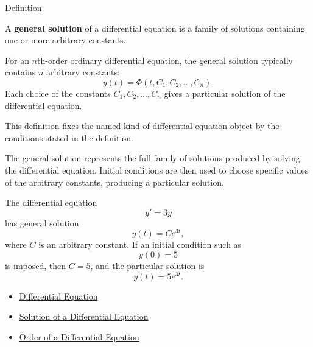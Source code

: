 
\begin{definitionbox}{Definition}
\begin{definition}
\label{def:ordinary-differential-equations-solutions-general-solution}
A \textbf{general solution} of a differential equation is a family of solutions containing one or more arbitrary constants.

For an $n$th-order ordinary differential equation, the general solution typically contains $n$ arbitrary constants:
\[
y(t)=\Phi(t,C_1,C_2,\dots,C_n).
\]
Each choice of the constants $C_1,C_2,\dots,C_n$ gives a particular solution of the differential equation.
\end{definition}
\end{definitionbox}

\begin{remark*}
This definition fixes the named kind of differential-equation object by the
conditions stated in the definition.
\end{remark*}

\begin{remark*}[Interpretation]
The general solution represents the full family of solutions produced by solving the differential equation. Initial conditions are then used to choose specific values of the arbitrary constants, producing a particular solution.
\end{remark*}

\begin{remark*}[Examples]
The differential equation
\[
y'=3y
\]
has general solution
\[
y(t)=Ce^{3t},
\]
where $C$ is an arbitrary constant. If an initial condition such as
\[
y(0)=5
\]
is imposed, then $C=5$, and the particular solution is
\[
y(t)=5e^{3t}.
\]
\end{remark*}

\begin{dependencies}
\begin{itemize}
  \item \hyperref[def:ordinary-differential-equations-terminology-differential-equation]{Differential Equation}
  \item \hyperref[def:ordinary-differential-equations-terminology-solution-of-a-differential-equation]{Solution of a Differential Equation}
  \item \hyperref[def:ordinary-differential-equations-terminology-order-of-a-differential-equation]{Order of a Differential Equation}
\end{itemize}
\end{dependencies}

